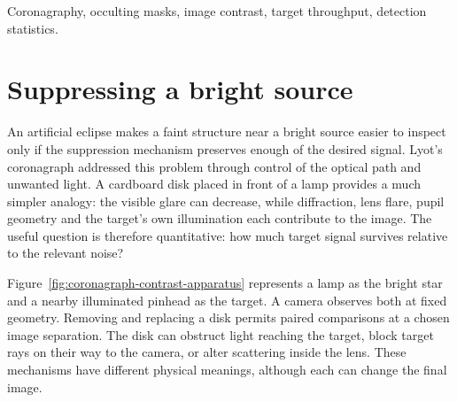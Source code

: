 \begin{abstract}
An occulting mask can reduce background glare while also attenuating a nearby target. The data comprise twenty-four fixed-exposure observations at six image separations, with two observations for each mask state. Across separations, the mask retains on average 36.1\% of the local background and 36.4\% of the background-subtracted target signal. Local relative contrast consequently changes little, while the mean individual noise-normalized signal falls to 78.8\% of its unmasked value. Thus background suppression alone does not establish improved detectability. The analysis distinguishes local contrast, target throughput and statistical evidence, connecting a simple lamp-and-pinhead model to the measurement requirements of high-contrast imaging.
\end{abstract}
\begin{IEEEkeywords}
Coronagraphy, occulting masks, image contrast, target throughput, detection statistics.
\end{IEEEkeywords}

\section{Suppressing a bright source}
An artificial eclipse makes a faint structure near a bright source easier to inspect only if the suppression mechanism preserves enough of the desired signal. Lyot's coronagraph addressed this problem through control of the optical path and unwanted light\cite{lyot1939}. A cardboard disk placed in front of a lamp provides a much simpler analogy: the visible glare can decrease, while diffraction, lens flare, pupil geometry and the target's own illumination each contribute to the image. The useful question is therefore quantitative: how much target signal survives relative to the relevant noise?

Figure~\ref{fig:coronagraph-contrast-apparatus} represents a lamp as the bright star and a nearby illuminated pinhead as the target. A camera observes both at fixed geometry. Removing and replacing a disk permits paired comparisons at a chosen image separation. The disk can obstruct light reaching the target, block target rays on their way to the camera, or alter scattering inside the lens. These mechanisms have different physical meanings, although each can change the final image.


